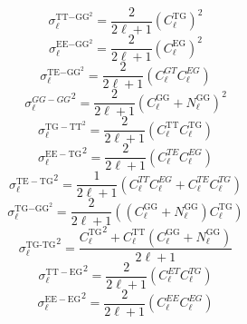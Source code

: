   \begin{equation}
    \sigma_{\ell}^{\textrm{} \textrm{TT$-$GG}^2} = \frac{2}{2 \ell + 1} 
    (C_{\ell}^{\mathrm{TG}} )^2
  \end{equation}
  \begin{equation}
    \sigma_{\ell}^{\textrm{} \textrm{EE$-$GG}^2} = \frac{2}{2 \ell + 1} 
    (C_{\ell}^{\mathrm{EG}} )^2
  \end{equation}
  \begin{equation}
    \sigma_{\ell}^{\textrm{TE$-$GG}^2} = \frac{2}{2 \ell + 1} 
    (C_{\ell}^{{GT}} C_{\ell}^{{EG}})
  \end{equation}
  \begin{equation}
    {\sigma_{\ell}^{{GG} - {GG}}}^2 = \frac{2}{2 \ell + 1}
    (C_{\ell}^{\mathrm{GG}} + N_{\ell}^{\mathrm{GG}})^2
  \end{equation}
  \begin{equation}
    \sigma_{\ell}^{\mathrm{TG} - \mathrm{TT}^2} = \frac{2}{2 \ell + 1} 
    (C_{\ell}^{\mathrm{TT}} C_{\ell}^{\mathrm{TG}})
  \end{equation}
  \begin{equation}
    {\sigma_{\ell}^{\mathrm{EE} - \mathrm{TG}}}^2 = \frac{2}{2 \ell + 1}
    (C_{\ell}^{{TE}} C_{\ell}^{{EG}})
  \end{equation}
  \begin{equation}
    {\sigma_{\ell}^{\mathrm{TE} - \mathrm{TG}}}^2 = \frac{1}{2 \ell + 1}
    (C_{\ell}^{{TT}} C_{\ell}^{{EG}} + C_{\ell}^{{TE}}
    C_{\ell}^{{TG}})
  \end{equation}
  \begin{equation}
    \sigma_{\ell}^{\textrm{TG$\textrm{$-$GG}$}^2} = \frac{2}{2 \ell + 1} 
    ((C_{\ell}^{\mathrm{GG}} + N_{\ell}^{\mathrm{GG}}) C_{\ell}^{\mathrm{TG}})
  \end{equation}
  \begin{equation}
    {\sigma_{\ell}^{\textrm{TG-TG}}}^2 = \frac{{C_{\ell}^{\mathrm{TG}}}^2 +
    C_{\ell}^{\mathrm{TT}}  (C_{\ell}^{\mathrm{GG}} + N_{\ell}^{\mathrm{GG}})}{2
    \ell + 1}
  \end{equation}
  \begin{equation}
    {\sigma_{\ell}^{\mathrm{TT} - \mathrm{EG}}}^2 = \frac{2}{2 \ell + 1}
    (C_{\ell}^{{ET}} C_{\ell}^{{TG}})
  \end{equation}
  \begin{equation}
    {\sigma_{\ell}^{\mathrm{EE} - \mathrm{EG}}}^2 = \frac{2}{2 \ell + 1}
    (C_{\ell}^{{EE}} C_{\ell}^{{EG}})
  \end{equation}
  
